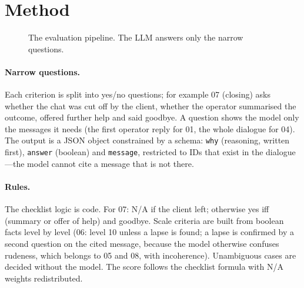 \documentclass[11pt,a4paper]{article}
\begin{document}
\section{Method}
\begin{figure}[h]\centering
{}
\caption{The evaluation pipeline. The LLM answers only the narrow questions.}
\end{figure}

\paragraph{Narrow questions.} Each criterion is split into yes/no questions; for example 07 (closing) asks
whether the chat was cut off by the client, whether the operator summarised the outcome, offered further
help and said goodbye. A question shows the model only the messages it needs (the first operator reply for
01, the whole dialogue for 04). The output is a JSON object constrained by a schema: \texttt{why} (reasoning,
written first), \texttt{answer} (boolean) and \texttt{message}, restricted to IDs that exist in the
dialogue---the model cannot cite a message that is not there.

\paragraph{Rules.} The checklist logic is code. For 07: N/A if the client left; otherwise yes iff
(summary or offer of help) and goodbye. Scale criteria are built from boolean facts level by level (06:
level 10 unless a lapse is found; a lapse is confirmed by a second question on the cited message, because the
model otherwise confuses rudeness, which belongs to 05 and 08, with incoherence). Unambiguous cases are
decided without the model. The score follows the checklist formula with N/A weights redistributed.
\end{document}
